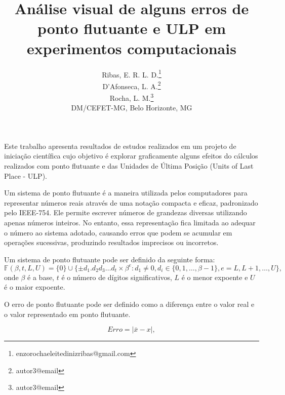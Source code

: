 \documentclass{pssbmac}
\begin{document}

\title{Análise visual de alguns erros de ponto flutuante e ULP em experimentos computacionais}

\author{
    {\large Ribas, E. R. L. D.}\thanks{enzorochaeleitedinizribas@gmail.com}\\
    {\large D'Afonseca, L. A.}\thanks{autor3@email}  \\
    {\large Rocha, L. M.}\thanks{autor3@email}  \\
    {\small DM/CEFET-MG, Belo Horizonte, MG} \\
}
\criartitulo


Este trabalho apresenta resultados de estudos realizados em um projeto de iniciação científica cujo objetivo é explorar graficamente alguns efeitos do cálculos realizados com ponto flutuante e das Unidades de Última Posição (Units of Last Place - ULP).

Um sistema de ponto flutuante é a maneira utilizada pelos computadores para representar números reais através de uma notação compacta e eficaz, padronizado pelo IEEE-754. Ele permite escrever números de grandezas diversas utilizando apenas números inteiros. No entanto, essa representação fica limitada ao adequar o número ao sistema adotado, causando erros que podem se acumular em operações sucessivas, produzindo resultados imprecisos ou incorretos.

Um sistema de ponto flutuante pode ser definido da seguinte forma:
\begin{equation}
\mathbb{F}(\beta, t, L, U) = \{0\} \cup \{\pm d_1.d_2d_3 \ldots d_t \times \beta^e : d_1 \neq 0, d_i \in \{0, 1, \ldots, \beta-1\}, e = L, L+1, \ldots, U\},
\end{equation}
onde $\beta$ é a base, $t$ é o número de dígitos significativos, $L$ é o menor expoente e $U$ é o maior expoente. 

O erro de ponto flutuante pode ser definido como a diferença entre o valor real e o valor representado em ponto flutuante. 

\begin{equation}
Erro = \left|\bar{x} - x\right|,
\end{equation}
\end{document}
